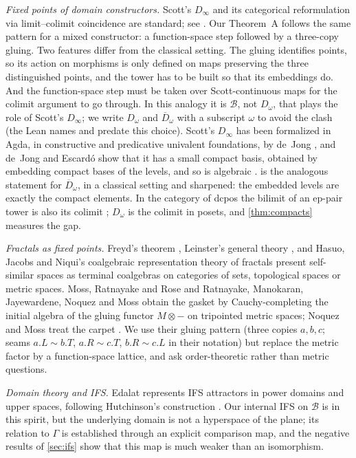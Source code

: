 \documentclass[11pt]{amsart}
\theoremstyle{plain}
\theoremstyle{definition}
\newcommand{\Dc}{D_\omega}
\newcommand{\Db}{\overline{D}_\omega}
\newcommand{\BB}{\mathcal{B}}
\newcommand{\GG}{\Gamma}
\begin{document}
\emph{Fixed points of domain constructors.} Scott's $D_\infty$
\cite{Scott1972} and its categorical reformulation via limit--colimit
coincidence \cite{SmythPlotkin1982} are standard; see
\cite{AbramskyJung1994,GierzEtAl2003}. Our Theorem~A follows the same pattern
for a mixed constructor: a function-space step followed by a three-copy gluing.
Two features differ from the classical setting. The gluing identifies points,
so its action on morphisms is only defined on maps preserving the three
distinguished points, and the tower has to be built so that its embeddings do.
And the function-space step must be taken over Scott-continuous maps for the
colimit argument to go through. In this analogy it is $\BB$, not $\Dc$, that
plays the role of Scott's $D_\infty$; we write $\Dc$ and $\Db$ with a subscript
$\omega$ to avoid the clash (the Lean names  and
 predate this choice). Scott's $D_\infty$ has been formalized in Agda, in
constructive and predicative univalent foundations, by de~Jong
\cite{deJong2024DInfty}, and de~Jong and Escard\'o show that it has a small
compact basis, obtained by embedding compact bases of the levels, and so is
algebraic \cite{deJongEscardo2024Continuous}.  is the
analogous statement for $\Db$, in a classical setting and sharpened: the
embedded levels are exactly the compact elements. In the category of dcpos the
bilimit of an ep-pair tower is also its colimit \cite{deJong2024DInfty}; $\Dc$
is the colimit in posets, and \cref{thm:compacts} measures the gap.

\emph{Fractals as fixed points.} Freyd's theorem \cite{Freyd2008}, Leinster's
general theory \cite{Leinster2011}, and Hasuo, Jacobs and Niqui's coalgebraic
representation theory of fractals \cite{HasuoJacobsNiqui2010} present
self-similar spaces as terminal coalgebras on categories of sets, topological
spaces or metric spaces. Moss, Ratnayake and Rose \cite{MossRatnayakeRose2014}
and Ratnayake, Manokaran, Jayewardene, Noquez and Moss \cite{RatnayakeEtAl2024}
obtain the gasket by Cauchy-completing the initial algebra of the gluing functor
$M\otimes-$ on tripointed metric spaces; Noquez and Moss treat the carpet
\cite{NoquezMoss2021}. We use their gluing pattern (three copies $a,b,c$; seams
$a.L\sim b.T$, $a.R\sim c.T$, $b.R\sim c.L$ in their notation) but replace the
metric factor by a function-space lattice, and ask order-theoretic rather than
metric questions.

\emph{Domain theory and IFS.} Edalat \cite{Edalat1996} represents IFS attractors
in power domains and upper spaces, following Hutchinson's construction
\cite{Hutchinson1981}. Our internal IFS on $\BB$ is in this spirit, but the
underlying domain is not a hyperspace of the plane; its relation to $\GG$ is
established through an explicit comparison map, and the negative results of
\cref{sec:ifs} show that this map is much weaker than an isomorphism.
\end{document}
